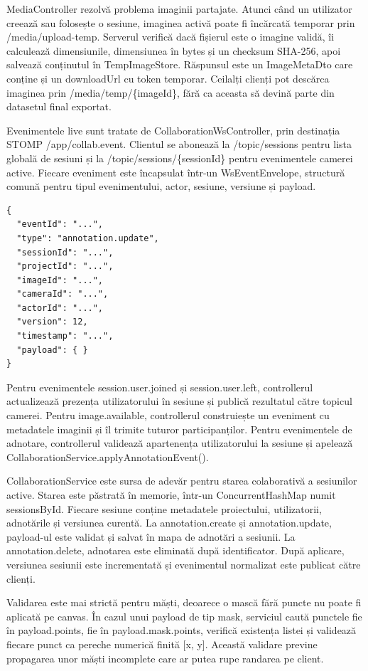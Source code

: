 MediaController rezolvă problema imaginii partajate. Atunci când un utilizator creează sau folosește o sesiune, imaginea activă poate fi încărcată temporar prin /media/upload-temp. Serverul verifică dacă fișierul este o imagine validă, îi calculează dimensiunile, dimensiunea în bytes și un checksum SHA-256, apoi salvează conținutul în TempImageStore. Răspunsul este un ImageMetaDto care conține și un downloadUrl cu token temporar. Ceilalți clienți pot descărca imaginea prin /media/temp/\{imageId\}, fără ca aceasta să devină parte din datasetul final exportat.

Evenimentele live sunt tratate de CollaborationWsController, prin destinația STOMP /app/collab.event. Clientul se abonează la /topic/sessions pentru lista globală de sesiuni și la /topic/sessions/\{sessionId\} pentru evenimentele camerei active. Fiecare eveniment este încapsulat într-un WsEventEnvelope, structură comună pentru tipul evenimentului, actor, sesiune, versiune și payload.

\begin{verbatim}
{
  "eventId": "...",
  "type": "annotation.update",
  "sessionId": "...",
  "projectId": "...",
  "imageId": "...",
  "cameraId": "...",
  "actorId": "...",
  "version": 12,
  "timestamp": "...",
  "payload": { }
}
\end{verbatim}

Pentru evenimentele session.user.joined și session.user.left, controllerul actualizează prezența utilizatorului în sesiune și publică rezultatul către topicul camerei. Pentru image.available, controllerul construiește un eveniment cu metadatele imaginii și îl trimite tuturor participanților. Pentru evenimentele de adnotare, controllerul validează apartenența utilizatorului la sesiune și apelează CollaborationService.applyAnnotationEvent().

CollaborationService este sursa de adevăr pentru starea colaborativă a sesiunilor active. Starea este păstrată în memorie, într-un ConcurrentHashMap numit sessionsById. Fiecare sesiune conține metadatele proiectului, utilizatorii, adnotările și versiunea curentă. La annotation.create și annotation.update, payload-ul este validat și salvat în mapa de adnotări a sesiunii. La annotation.delete, adnotarea este eliminată după identificator. După aplicare, versiunea sesiunii este incrementată și evenimentul normalizat este publicat către clienți.

Validarea este mai strictă pentru măști, deoarece o mască fără puncte nu poate fi aplicată pe canvas. În cazul unui payload de tip mask, serviciul caută punctele fie în payload.points, fie în payload.mask.points, verifică existența listei și validează fiecare punct ca pereche numerică finită [x, y]. Această validare previne propagarea unor măști incomplete care ar putea rupe randarea pe client.

